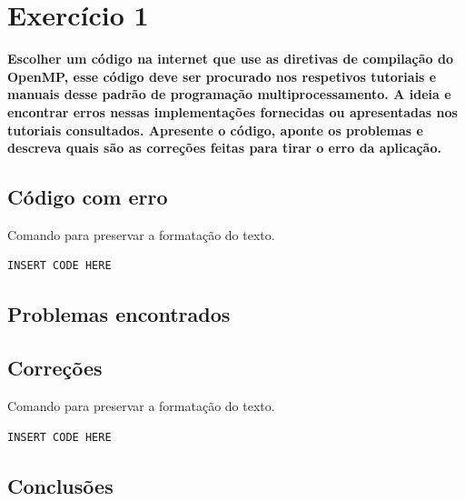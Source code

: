 \documentclass[a4paper,12pt,fleqn]{article}
\begin{document}
\section{Exercício 1} 
\textbf{Escolher um código na internet que use as diretivas de compilação do OpenMP, esse código deve ser procurado nos respetivos tutoriais e manuais desse padrão de programação multiprocessamento. A ideia e encontrar erros nessas implementações fornecidas ou apresentadas nos tutoriais consultados. Apresente o código, aponte os problemas e descreva quais são as correções feitas para tirar o erro da aplicação.} 
 
\subsection{Código com erro} 
Comando para preservar a formatação do texto. 
\begin{verbatim} 
INSERT CODE HERE 
\end{verbatim} 
 
\subsection{Problemas encontrados} 
 
\subsection{Correções} 
Comando para preservar a formatação do texto. 
\begin{verbatim} 
INSERT CODE HERE 
\end{verbatim} 
 
\subsection{Conclusões} 
 
\clearpage 
\end{document}
